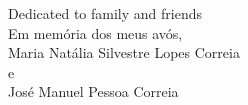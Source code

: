 
%

\begin{ntdedicatory}

Dedicated to family and friends
\\
\vspace{0.5cm}
\begingroup
\calligra
\LARGE
Em memória dos meus avós, \\
Maria Natália Silvestre Lopes Correia \\
e \\
José Manuel Pessoa Correia
\endgroup

\end{ntdedicatory}
